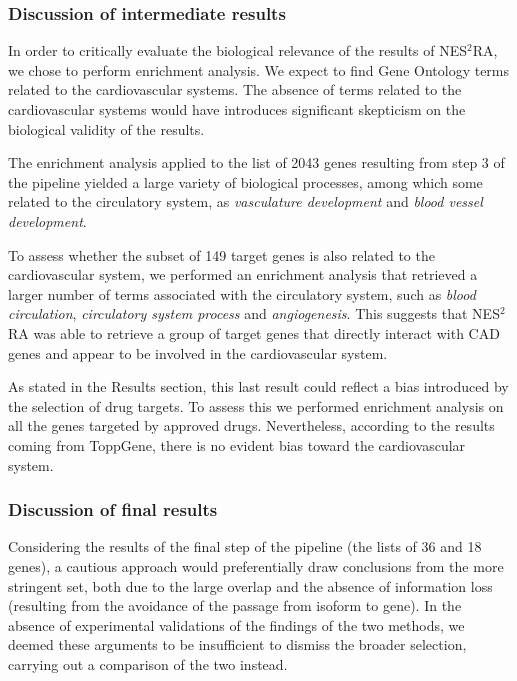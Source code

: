 \documentclass[fleqn,10pt]{SelfArx} %
\begin{document}
\subsubsection*{Discussion of intermediate results}

In order to critically evaluate the biological relevance of the results of 
NES$^2$RA, we chose to perform enrichment analysis. We expect to find Gene Ontology terms related to the cardiovascular systems. The absence of terms related to the cardiovascular systems would have introduces significant skepticism on the biological validity of the results.

The enrichment analysis applied to the list of 2043 genes resulting from step 3 of the pipeline yielded a large variety of biological processes, among which some related to the circulatory system, as \emph{vasculature development} and \emph{blood vessel development}.

To assess whether the subset of 149 target genes is also related to the cardiovascular system, we performed an enrichment analysis that retrieved a larger number of terms associated with the circulatory system, such as \emph{blood circulation}, \emph{circulatory system process} and \emph{angiogenesis}. This suggests that NES$^2$RA was able to retrieve a group of target genes that directly interact with CAD genes and appear to be involved in the cardiovascular system.

As stated in the Results section, this last result could reflect a bias introduced by the selection of drug targets. To assess this we performed enrichment analysis on all the genes targeted by approved drugs. Nevertheless, according to the results coming from ToppGene, there is no evident bias toward the cardiovascular system.

\subsubsection*{Discussion of final results}

Considering the results of the final step of the pipeline (the lists of 36 and 18 genes), a cautious approach would preferentially draw conclusions from the more stringent set, both due to the large overlap and the absence of information loss (resulting from the avoidance of the passage from isoform to gene). In the absence of experimental validations of the findings of the two methods, we deemed these arguments to be insufficient to dismiss the broader selection, carrying out a comparison of the two instead.
\end{document}
